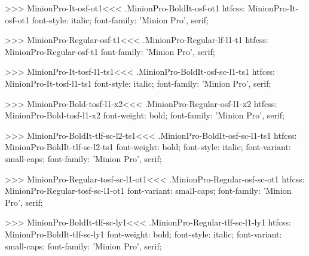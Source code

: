 {{>>>
\<MinionPro-It-osf-ot1\><<<
.MinionPro-BoldIt-osf-ot1
htfcss:  MinionPro-It-osf-ot1  font-style: italic; font-family: 'Minion Pro', serif;

>>>
\<MinionPro-Regular-osf-t1\><<<
.MinionPro-Regular-lf-l1-t1
htfcss:  MinionPro-Regular-osf-t1  font-family: 'Minion Pro', serif;

>>>
\<MinionPro-It-tosf-l1-ts1\><<<
.MinionPro-BoldIt-osf-sc-l1-ts1
htfcss:  MinionPro-It-tosf-l1-ts1  font-style: italic; font-family: 'Minion Pro', serif;

>>>
\<MinionPro-Bold-tosf-l1-x2\><<<
.MinionPro-Regular-osf-l1-x2
htfcss:  MinionPro-Bold-tosf-l1-x2  font-weight: bold; font-family: 'Minion Pro', serif;

>>>
\<MinionPro-BoldIt-tlf-sc-l2-ts1\><<<
.MinionPro-BoldIt-osf-sc-l1-ts1
htfcss:  MinionPro-BoldIt-tlf-sc-l2-ts1  font-weight: bold; font-style: italic; font-variant: small-caps; font-family: 'Minion Pro', serif;

>>>
\<MinionPro-Regular-tosf-sc-l1-ot1\><<<
.MinionPro-Regular-osf-sc-ot1
htfcss:  MinionPro-Regular-tosf-sc-l1-ot1  font-variant: small-caps; font-family: 'Minion Pro', serif;

>>>
\<MinionPro-BoldIt-tlf-sc-ly1\><<<
.MinionPro-Regular-tlf-sc-l1-ly1
htfcss:  MinionPro-BoldIt-tlf-sc-ly1  font-weight: bold; font-style: italic; font-variant: small-caps; font-family: 'Minion Pro', serif;

}}
